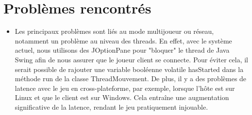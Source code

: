 \documentclass{article}
\begin{document}
\section{Problèmes rencontrés}
\begin{itemize}
    \item  Les principaux problèmes sont liés au mode multijoueur ou réseau, notamment un problème au niveau des threads. En effet, avec le système actuel, nous utilisons des JOptionPane pour "bloquer" le thread de Java Swing afin de nous assurer que le joueur client se connecte. Pour éviter cela, il serait possible de rajouter une variable booléenne volatile hasStarted dans la méthode run de la classe ThreadMouvement. De plus, il y a des problèmes de latence avec le jeu en cross-plateforme, par exemple, lorsque l'hôte est sur Linux et que le client est sur Windows. Cela entraîne une augmentation significative de la latence, rendant le jeu pratiquement injouable.
\end{itemize}
\end{document}
